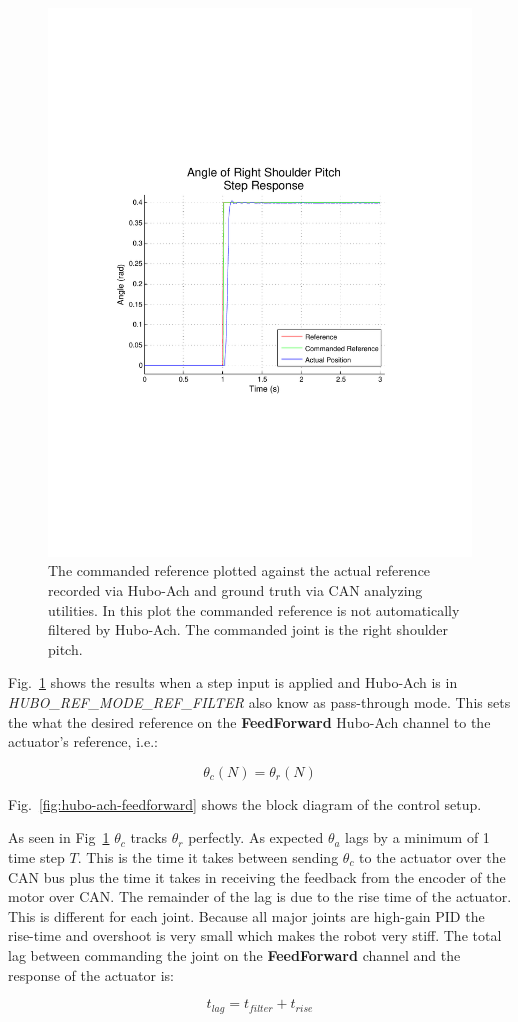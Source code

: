 \begin{figure}[thpb]
  \centering
\includegraphics[width=0.8\columnwidth]{./examples/pix/RSP-Zp4-step-step-real-crop.pdf}
  \caption{The commanded reference plotted against the actual reference recorded via Hubo-Ach and ground truth via CAN analyzing utilities.  In this plot the commanded reference is not automatically filtered by Hubo-Ach.  The commanded joint is the right shoulder pitch.}
  \label{fig:singleJointStep}
\end{figure}

Fig.~\ref{fig:singleJointStep} shows the results when a step input is applied and Hubo-Ach is in \textit{HUBO\_REF\_MODE\_REF\_FILTER} also know as pass-through mode.
This sets the what the desired reference on the \textbf{FeedForward} Hubo-Ach channel to the actuator's reference, i.e.:

\begin{equation}\label{eq:refrefmode}
 \theta_c(N) = \theta_r(N)
\end{equation}

Fig.~\ref{fig:hubo-ach-feedforward} shows the block diagram of the control setup.






As seen in Fig~\ref{fig:singleJointStep} $\theta_c$ tracks $\theta_r$ perfectly. As expected $\theta_a$ lags by a minimum of 1 time step $T$.  
This is the time it takes between sending $\theta_c$ to the actuator over the CAN bus plus the time it takes in receiving the feedback from the encoder of the motor over CAN.
The remainder of the lag is due to the rise time of the actuator.
This is different for each joint.
Because all major joints are high-gain PID the rise-time and overshoot is very small which makes the robot very stiff.
The total lag between commanding the joint on the \textbf{FeedForward} channel and the response of the actuator is:

\begin{equation}
t_{lag} = t_{filter} + t_{rise}
\end{equation}


